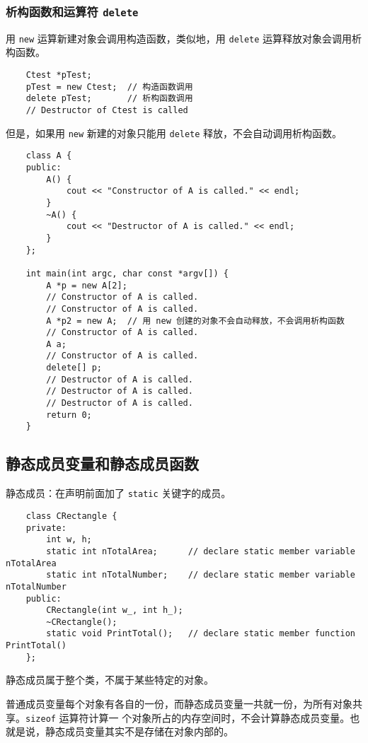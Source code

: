 \documentclass[UTF8]{ctexart}
\begin{document}
\subsubsection{析构函数和运算符 \texttt{delete}}
用 \texttt{new} 运算新建对象会调用构造函数，类似地，用 \texttt{delete} 运算释放对象会调用析
构函数。
\begin{verbatim}
    Ctest *pTest;
    pTest = new Ctest;  // 构造函数调用
    delete pTest;       // 析构函数调用
    // Destructor of Ctest is called
\end{verbatim}

但是，如果用 \texttt{new} 新建的对象只能用 \texttt{delete} 释放，不会自动调用析构函数。
\begin{verbatim}
    class A {
    public:
        A() {
            cout << "Constructor of A is called." << endl;
        }
        ~A() {
            cout << "Destructor of A is called." << endl;
        }
    };

    int main(int argc, char const *argv[]) {
        A *p = new A[2];
        // Constructor of A is called.
        // Constructor of A is called.
        A *p2 = new A;  // 用 new 创建的对象不会自动释放，不会调用析构函数
        // Constructor of A is called.
        A a;
        // Constructor of A is called.
        delete[] p;
        // Destructor of A is called.
        // Destructor of A is called.
        // Destructor of A is called.
        return 0;
    }
\end{verbatim}

\subsection{静态成员变量和静态成员函数}
静态成员：在声明前面加了 \texttt{static} 关键字的成员。
\begin{verbatim}
    class CRectangle {
    private:
        int w, h;
        static int nTotalArea;      // declare static member variable nTotalArea
        static int nTotalNumber;    // declare static member variable nTotalNumber
    public:
        CRectangle(int w_, int h_);
        ~CRectangle();
        static void PrintTotal();   // declare static member function PrintTotal()
    };
\end{verbatim}

静态成员属于整个类，不属于某些特定的对象。

普通成员变量每个对象有各自的一份，而静态成员变量一共就一份，为所有对象共享。\texttt{sizeof} 运算符计算一
个对象所占的内存空间时，不会计算静态成员变量。也就是说，静态成员变量其实不是存储在对象内部的。
\end{document}
